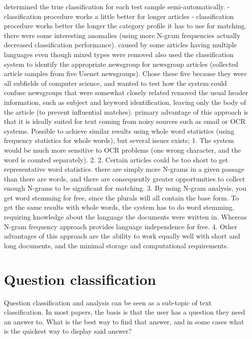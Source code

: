 determined the true classification for each test sample semi-automatically.
-	classification procedure works a little better for longer articles
-	classification procedure works better the longer the category profile it has to use for matching. there were some interesting anomalies (using more N-gram frequencies actually decreased classification performance). caused by some articles having multiple languages even though mixed types were removed
also used the classification system to identify the appropriate newsgroup for newsgroup articles (collected article samples from five Usenet newsgroups). Chose these five because they were all subfields of computer science, and wanted to test how the system could confuse newsgroups that were somewhat closely related removed the usual header information, such as subject and keyword identification, leaving only the body of the article (to prevent influential matches). 
primary advantage of this approach is that it is ideally suited for text coming from noisy sources such as email or OCR systems. Possible to achieve similar results using whole word statistics (using frequency statistics for whole words), but several issues exists;
1.	The system would be much more sensitive to OCR problems (one wrong character, and the word is counted separately). 
2.	2. Certain articles could be too short to get representative word statistics. there are simply more N-grams in a given    passage than there are words, and there are consequently greater opportunities to collect enough N-grams to be significant for matching.
3.	By using N-gram analysis, you get word stemming for free, since the plurals will all contain the base form. To get the same results with whole words, the system has to do word stemming, requiring knowledge about the language the documents were written in.  Whereas N-gram frequency approach provides language independence for free.
4.	Other advantages of this approach are the ability to work equally well with short and long documents, and the minimal storage and computational requirements.
\cite{Cavnar1994}

\section{Question classification}
\label{sec:question_answering}
Question classification and analysis can be seen as a sub-topic of text classification. 
In most papers, the basis is that the user has a question they need an answer to. 
What is the best way to find that answer, and in some cases what is the quickest way to display said answer?
 
